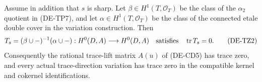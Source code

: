 \begin{proposition}
\label{prop:DE-A3-positive-cup-trace-zero-candidate}
Assume in addition that $s$ is sharp. Let $\beta\in H^1(T,\mathcal O_T)$
be the class of the $\alpha_2$ quotient in (DE-TP7), and let
$\alpha\in H^1(T,\mathcal O_T)$ be the class of the connected
etale double cover in the variation construction. Then
\[
 T_s=(\beta\cup-)^{-1}(\alpha\cup-):
                       H^0(D,A)\longrightarrow H^0(D,A)
                         \quad\hbox{satisfies}\quad
                            \operatorname{tr}T_s=0.           \tag{DE-TZ2}
\]
Consequently the rational trace-lift matrix $A(u)$ of (DE-CD5)
has trace zero, and every actual trace-direction variation has
trace zero in the compatible kernel and cokernel identifications.
\end{proposition}
